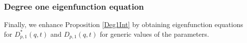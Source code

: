 \documentclass{amsart}
\renewcommand{\triangle}{\vartriangle}
\newcommand{\Ju}{{\underline{J}}}
\theoremstyle{remark}
\numberwithin{thm}{section}
\numberwithin{equation}{section}
\begin{document}
\subsubsection{Degree one eigenfunction equation}\label{FirstOp}
Finally, we enhance Proposition \ref{Deg1Int} by obtaining eigenfunction equations for $D_{p,1}^*(q,t)$ and $D_{p,1}(q,t)$ for generic values of the parameters.
\end{document}
